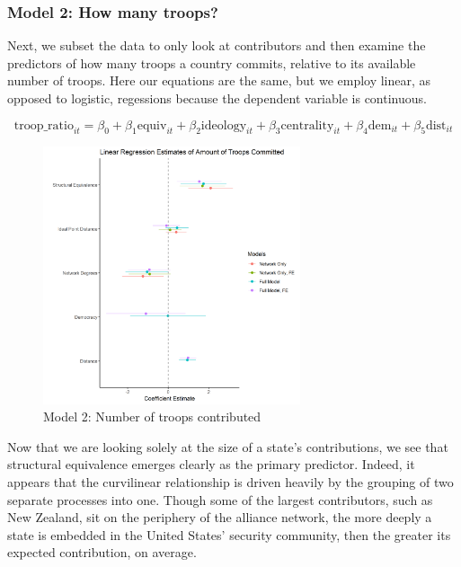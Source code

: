 \documentclass[12pt,letterpaper]{article}
\begin{document}
		\subsubsection{Model 2: How many troops?}

		Next, we subset the data to only look at contributors and then examine the predictors of how many troops a country commits, relative to its available number of troops. Here our equations are the same, but we employ linear, as opposed to logistic, regessions because the dependent variable is continuous.

			\begin{equation*}
				\text{troop\_ratio}_{it} = \beta_0 + \beta_1\text{equiv}_{it} + \beta_2\text{ideology}_{it} + \beta_3\text{centrality}_{it} + \beta_4\text{dem}_{it} + \beta_5\text{dist}_{it}
			\end{equation*}

			\begin{figure}[H]
			\centering
				\includegraphics[width=0.675\textwidth]{linear_coef.png}
			\caption{Model 2: Number of troops contributed}
			\label{fig:linear_reg}
			\end{figure}

		Now that we are looking solely at the size of a state's contributions, we see that structural equivalence emerges clearly as the primary predictor. Indeed, it appears that the curvilinear relationship is driven heavily by the grouping of two separate processes into one. Though some of the largest contributors, such as New Zealand, sit on the periphery of the alliance network, the more deeply a state is embedded in the United States' security community, then the greater its expected contribution, on average.
\end{document}
